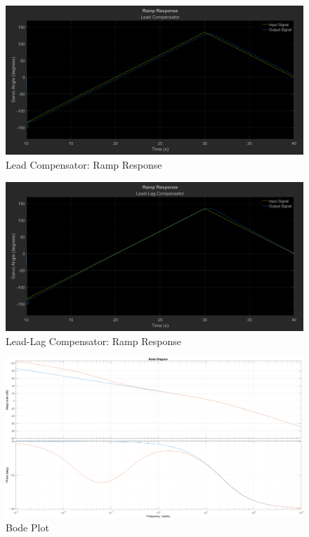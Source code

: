 \documentclass[12pt]{article}
\begin{document}
\begin{figure}[h!]
	\centering
    \includegraphics[width=\textwidth]{ramp_lead}
    \caption{\label{fig:ramp_lead}Lead Compensator: Ramp Response}
\end{figure}

\begin{figure}[h!]
    \centering
    \includegraphics[width=\textwidth]{ramp_leadlag}
    \caption{\label{fig:ramp_leadlag}Lead-Lag Compensator: Ramp Response}
\end{figure}

\begin{figure}[h!]
    \centering
    \includegraphics[width=\textwidth]{bode}
    \caption{\label{fig:bode}Bode Plot}
\end{figure}
\end{document}
